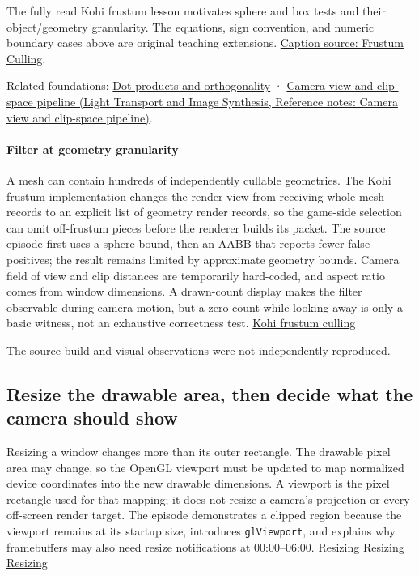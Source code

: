 The fully read Kohi frustum lesson motivates sphere and box tests and their object/geometry granularity. The equations, sign convention, and numeric boundary cases above are original teaching extensions. \href{https://www.youtube.com/watch?v=vJrfcI_bMTA}{Caption source: Frustum Culling}.

Related foundations: \hyperref[appendix-8bc4e8fc547c]{Dot products and orthogonality} · \href{../04-Light-Transport-and-Image-Synthesis/main.pdf\#nameddest=appendix-1c07d64f5e70}{Camera view and clip-space pipeline (Light Transport and Image Synthesis, Reference notes: Camera view and clip-space pipeline)}.

\paragraph{Filter at geometry granularity}\label{06-engine-ii-ch026-filter-at-geometry-granularity}

A mesh can contain hundreds of independently cullable geometries. The Kohi frustum implementation changes the render view from receiving whole mesh records to an explicit list of geometry render records, so the game-side selection can omit off-frustum pieces before the renderer builds its packet. The source episode first uses a sphere bound, then an AABB that reports fewer false positives; the result remains limited by approximate geometry bounds. Camera field of view and clip distances are temporarily hard-coded, and aspect ratio comes from window dimensions. A drawn-count display makes the filter observable during camera motion, but a zero count while looking away is only a basic witness, not an exhaustive correctness test. \href{https://www.youtube.com/watch?v=vJrfcI_bMTA}{Kohi frustum culling}

The source build and visual observations were not independently reproduced.

\subsection{Resize the drawable area, then decide what the camera should show}\label{06-engine-ii-ch026-resize-the-drawable-area-then-decide-what-the-camera-should-show}

Resizing a window changes more than its outer rectangle. The drawable pixel area may change, so the OpenGL viewport must be updated to map normalized device coordinates into the new drawable dimensions. A viewport is the pixel rectangle used for that mapping; it does not resize a camera's projection or every off-screen render target. The episode demonstrates a clipped region because the viewport remains at its startup size, introduces \texttt{glViewport}, and explains why framebuffers may also need resize notifications at 00:00--06:00. \href{https://www.youtube.com/watch?v=7LswjvgRqbw&t=0s}{Resizing} \href{https://www.youtube.com/watch?v=7LswjvgRqbw&t=120s}{Resizing} \href{https://www.youtube.com/watch?v=7LswjvgRqbw&t=240s}{Resizing}

